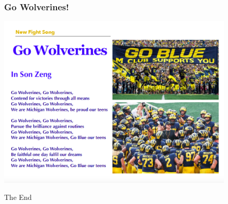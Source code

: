 \documentclass{beamer}
\begin{document}

\begin{frame}
\frametitle{Go Wolverines!}

\includegraphics[width=0.85\textwidth]{Go Wolverines.png}

\end{frame}

\begin{frame}
\Huge{\centerline{The End}}
\end{frame}

\end{document}
